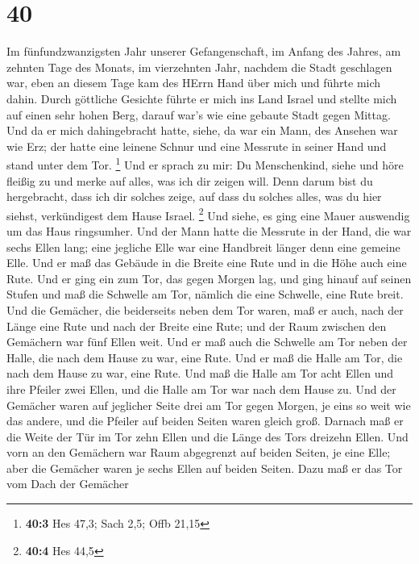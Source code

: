 \hypertarget{section-39}{%
\section{40}\label{section-39}}

 Im fünfundzwanzigsten Jahr unserer Gefangenschaft, im
Anfang des Jahres, am zehnten Tage des Monats, im vierzehnten Jahr,
nachdem die Stadt geschlagen war, eben an diesem Tage kam des HErrn Hand
über mich und führte mich dahin.  Durch göttliche Gesichte
führte er mich ins Land Israel und stellte mich auf einen sehr hohen
Berg, darauf war's wie eine gebaute Stadt gegen Mittag. 
Und da er mich dahingebracht hatte, siehe, da war ein Mann, des Ansehen
war wie Erz; der hatte eine leinene Schnur und eine Messrute in seiner
Hand und stand unter dem Tor. \footnote{\textbf{40:3} Hes 47,3; Sach
  2,5; Offb 21,15}  Und er sprach zu mir: Du Menschenkind,
siehe und höre fleißig zu und merke auf alles, was ich dir zeigen will.
Denn darum bist du hergebracht, dass ich dir solches zeige, auf dass du
solches alles, was du hier siehst, verkündigest dem Hause Israel.
\footnote{\textbf{40:4} Hes 44,5}  Und siehe, es ging eine
Mauer auswendig um das Haus ringsumher. Und der Mann hatte die Messrute
in der Hand, die war sechs Ellen lang; eine jegliche Elle war eine
Handbreit länger denn eine gemeine Elle. Und er maß das Gebäude in die
Breite eine Rute und in die Höhe auch eine Rute.  Und er
ging ein zum Tor, das gegen Morgen lag, und ging hinauf auf seinen
Stufen und maß die Schwelle am Tor, nämlich die eine Schwelle, eine Rute
breit.  Und die Gemächer, die beiderseits neben dem Tor
waren, maß er auch, nach der Länge eine Rute und nach der Breite eine
Rute; und der Raum zwischen den Gemächern war fünf Ellen weit. Und er
maß auch die Schwelle am Tor neben der Halle, die nach dem Hause zu war,
eine Rute.  Und er maß die Halle am Tor, die nach dem
Hause zu war, eine Rute.  Und maß die Halle am Tor acht
Ellen und ihre Pfeiler zwei Ellen, und die Halle am Tor war nach dem
Hause zu.  Und der Gemächer waren auf jeglicher Seite
drei am Tor gegen Morgen, je eins so weit wie das andere, und die
Pfeiler auf beiden Seiten waren gleich groß.  Darnach maß
er die Weite der Tür im Tor zehn Ellen und die Länge des Tors dreizehn
Ellen.  Und vorn an den Gemächern war Raum abgegrenzt auf
beiden Seiten, je eine Elle; aber die Gemächer waren je sechs Ellen auf
beiden Seiten.  Dazu maß er das Tor vom Dach der Gemächer
